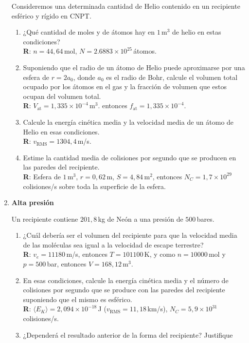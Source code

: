 \documentclass[a4paper,12pt]{article}
\begin{document}
\begin{enumerate}
		Consideremos una determinada cantidad de Helio contenido en un
		recipiente esférico y rígido en CNPT.
		\begin{enumerate}
			\item ¿Qué cantidad de moles y de átomos hay en $1$\,m$^3$ de
				helio en estas condiciones?
				\\{\bf R}: $n=44,64$\,mol, $N=2.6883\times 10^{25}$\,átomos.
			\item Suponiendo que el radio de un átomo de Helio puede
				aproximarse por una esfera de $r=2 a_0$, donde $a_0$ es el
				radio de Bohr, calcule el volumen total ocupado por los átomos
				en el gas y la fracción de volumen que estos ocupan del volumen
				total. 
				\\{\bf R}: $V_{\mathrm{at}}=1,335\times 10^{-4}$\,m$^3$.
				entonces $f_{\mathrm{at}}=1,335\times 10^{-4}$.
			\item Calcule la energía cinética media y la velocidad media de un
				átomo de Helio en esas condiciones. 
				\\{\bf R}: $v_{\mathrm{RMS}}=1304,4$\,m/s.
			\item Estime la cantidad media de colisiones por segundo que se
				producen en las paredes del recipiente. 
				\\{\bf R}: Esfera de $1$\,m$^3$, $r=0,62$\,m, $S=4,84$\,m$^2$,
				entonces $N_C=1,7 \times 10^{29}$\,colisiones/s sobre toda la
				superficie de la esfera.
		\end{enumerate}
	
	\item {\bf{Alta presión}}
	
		Un recipiente contiene $201,8$\,kg de Neón a una presión de $500$\,bares. 
		\begin{enumerate}
			\item ¿Cuál debería ser el volumen del recipiente para que la
				velocidad media de las moléculas sea igual a la velocidad de
				escape terrestre? 
				\\{\bf R}: $v_e=11180$\,m/s, entonces $T=101100$\,K, y como
				$n=10000$\,mol y $p=500$\,bar, entonces $V=168,12$\,m$^3$. 
			\item En esas condiciones, calcule la energía cinética media y el
				número de colisiones por segundo que se produce con las paredes
				del recipiente suponiendo que el mismo es esférico. 
				\\{\bf R}: $\langle E_K \rangle = 2,094 \times 10^{-18}$\,J
				($v_{\mathrm{RMS}}=11,18$\,km/s), $N_C=5,9 \times
				10^{31}$\,colisiones/s.
			\item ¿Dependerá el resultado anterior de la forma del recipiente?
				Justifique
		\end{enumerate}


\end{enumerate}
\end{document}
